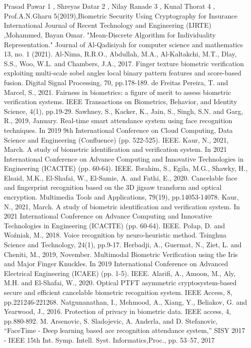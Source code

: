 \documentclass[conference]{IEEEtran}
\begin{document}
\section*{}
\begin{thebibliography}{00}
 Prasad Pawar 1 , Shreyas Datar 2 , Nilay Ranade 3 , Kunal Thorat 4 , Prof.A.N.Gharu 5(2019),Biometric Security Using Cryptography for Insurance
 International Journal of Recent Technology and Engineering (IJRTE) ,Mohammed, Bayan Omar. "Mean-Discrete Algorithm for Individuality Representation." Journal of Al-Qadisiyah for computer science and mathematics 13, no. 1 (2021).
 Al-Nima, R.R.O., Abdullah, M.A., Al-Kaltakchi, M.T., Dlay, S.S., Woo, W.L. and Chambers, J.A., 2017. Finger texture biometric verification exploiting multi-scale sobel angles local binary pattern features and score-based fusion. Digital Signal Processing, 70, pp.178-189.
 de Freitas Pereira, T. and Marcel, S., 2021. Fairness in biometrics: a figure of merit to assess biometric verification systems. IEEE Transactions on Biometrics, Behavior, and Identity Science, 4(1), pp.19-29.
 Sawhney, S., Kacker, K., Jain, S., Singh, S.N. and Garg, R., 2019, January. Real-time smart attendance system using face recognition techniques. In 2019 9th International Conference on Cloud Computing, Data Science and Engineering (Confluence) (pp. 522-525). IEEE.
 Kaur, N., 2021, March. A study of biometric identification and verification system. In 2021 International Conference on Advance Computing and Innovative Technologies in Engineering (ICACITE) (pp. 60-64). IEEE.
 Ibrahim, S., Egila, M.G., Shawky, H., Elsaid, M.K., El-Shafai, W., El-Samie, A. and Fathi, E., 2020. Cancelable face and fingerprint recognition based on the 3D jigsaw transform and optical encryption. Multimedia Tools and Applications, 79(19), pp.14053-14078.
 Kaur, N., 2021, March. A study of biometric identification and verification system. In 2021 International Conference on Advance Computing and Innovative Technologies in Engineering (ICACITE) (pp. 60-64). IEEE.
 Połap, D. and Woźniak, M., 2018. Voice recognition by neuro-heuristic method. Tsinghua Science and Technology, 24(1), pp.9-17.
 Herbadji, A., Guermat, N., Ziet, L. and Cheniti, M., 2019, November. Multimodal Biometric Verification using the Iris and Major Finger Knuckles. In 2019 International Conference on Advanced Electrical Engineering (ICAEE) (pp. 1-5). IEEE.
 Alarifi, A., Amoon, M., Aly, M.H. and El-Shafai, W., 2020. Optical PTFT asymmetric cryptosystem-based secure and efficient cancelable biometric recognition system. IEEE Access, 8, pp.221246-221268.
 Natgunanathan, I., Mehmood, A., Xiang, Y., Beliakov, G. and Yearwood, J., 2016. Protection of privacy in biometric data. IEEE access, 4, pp.880-892.
 M. Arsenovic, S. Sladojevic, A. Anderla, and D. Stefanovic, “FaceTime - Deep learning based
 ace recognition attendance system,” SISY 2017 - IEEE 15th Int. Symp. Intell. Syst. Informatics,Proc., pp. 53–57, 2017
\end{thebibliography}
\end{document}
